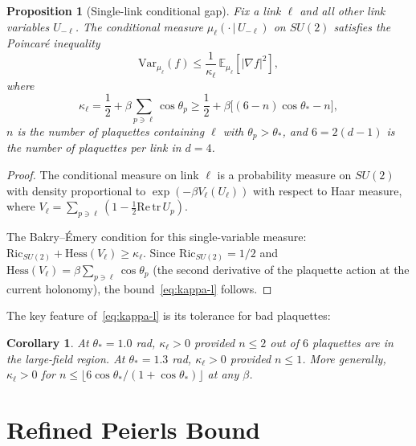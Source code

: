 \documentclass[11pt,a4paper]{article}
\theoremstyle{plain}
\newtheorem{proposition}[theorem]{Proposition}
\newtheorem{corollary}[theorem]{Corollary}
\theoremstyle{definition}
\theoremstyle{remark}
\newcommand{\tr}{\mathrm{tr}}
\newcommand{\Hess}{\mathrm{Hess}}
\newcommand{\Ric}{\mathrm{Ric}}
\newcommand{\Var}{\mathrm{Var}}
\newcommand{\E}{\mathbb{E}}
\begin{document}
\begin{proposition}[Single-link conditional gap]
\label{prop:conditional}
Fix a link $\ell$ and all other link variables $U_{-\ell}$.
The conditional measure $\mu_\ell(\cdot\,|\,U_{-\ell})$ on
$SU(2)$ satisfies the Poincar\'e inequality
\begin{equation}\label{eq:conditional-poincare}
  \Var_{\mu_\ell}(f)
  \leq \frac{1}{\kappa_\ell}\,\E_{\mu_\ell}[|\nabla f|^2],
\end{equation}
where
\begin{equation}\label{eq:kappa-l}
  \kappa_\ell
  = \frac{1}{2} + \beta\sum_{p \ni \ell} \cos\theta_p
  \geq \frac{1}{2} + \beta\bigl[(6 - n)\cos\theta_* - n\bigr],
\end{equation}
$n$ is the number of plaquettes containing $\ell$ with
$\theta_p > \theta_*$, and $6 = 2(d-1)$ is the number of plaquettes
per link in $d = 4$.
\end{proposition}

\begin{proof}
The conditional measure on link $\ell$ is a probability measure
on $SU(2)$ with density proportional to
$\exp(-\beta V_\ell(U_\ell))$ with respect to Haar measure,
where $V_\ell = \sum_{p \ni \ell} (1 - \frac{1}{2}\mathrm{Re}\,\tr\,U_p)$.

The Bakry--\'Emery condition for this single-variable measure:
$\Ric_{SU(2)} + \Hess(V_\ell) \geq \kappa_\ell$.
Since $\Ric_{SU(2)} = 1/2$ and
$\Hess(V_\ell) = \beta\sum_{p \ni \ell} \cos\theta_p$
(the second derivative of the plaquette action at the current
holonomy), the bound~\eqref{eq:kappa-l} follows.
\end{proof}

The key feature of~\eqref{eq:kappa-l} is its tolerance for
bad plaquettes:

\begin{corollary}\label{cor:tolerance}
At $\theta_* = 1.0$ rad, $\kappa_\ell > 0$ provided $n \leq 2$
out of $6$ plaquettes are in the large-field region.
At $\theta_* = 1.3$ rad, $\kappa_\ell > 0$ provided $n \leq 1$.
More generally, $\kappa_\ell > 0$ for $n \leq \lfloor
6\cos\theta_*/(1 + \cos\theta_*)\rfloor$ at any $\beta$.
\end{corollary}


\section{Refined Peierls Bound}\label{sec:peierls}
\end{document}
